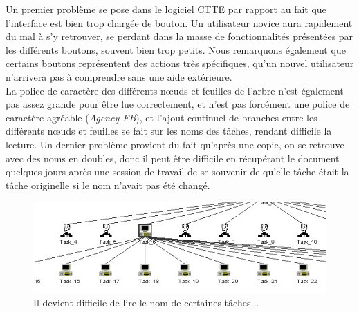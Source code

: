 \documentclass[12pt, a4paper]{article}
\begin{document}
Un premier problème se pose dans le logiciel CTTE par rapport au fait que l'interface est bien trop chargée de bouton. Un utilisateur novice aura rapidement du mal à s'y retrouver, se perdant dans la masse de fonctionnalités présentées par les différents boutons, souvent bien trop petits. Nous remarquons également que certains boutons représentent des actions très spécifiques, qu'un nouvel utilisateur n'arrivera pas à comprendre sans une aide extérieure.\\ 
La police de caractère des différents nœuds et feuilles de l'arbre n'est également pas assez grande pour être lue correctement, et n'est pas forcément une police de caractère agréable (\emph{Agency FB}), et l'ajout continuel de branches entre les différents nœuds et feuilles se fait sur les noms des tâches, rendant difficile la lecture. Un dernier problème provient du fait qu'après une copie, on se retrouve avec des noms en doubles, donc il peut être difficile en récupérant le document quelques jours après une session de travail de se souvenir de qu'elle tâche était la tâche originelle si le nom n'avait pas été changé. 
\begin{figure}[h]
\begin{center}
   \includegraphics[scale = 0.5]{empilement.jpg}
	\caption{Il devient difficile de lire le nom de certaines tâches...}
	\end{center}
\end{figure}
\end{document}
